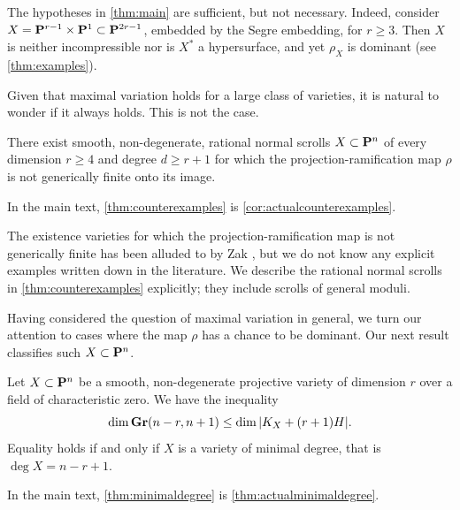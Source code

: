 \documentclass[11pt,reqno]{amsart}
\theoremstyle{plain}
\theoremstyle{definition}
\theoremstyle{remark}
\numberwithin{equation}{section}
\numberwithin{equation}{section}
\begin{document}
The hypotheses in \autoref{thm:main} are sufficient, but not necessary.
Indeed, consider $X = \P^{r-1} \times \P^1 \subset \P^{2r-1}$, embedded by the Segre embedding, for $r \geq 3$.
Then $X$ is neither incompressible nor is $X^*$ a hypersurface, and yet $\rho_X$ is dominant (see \autoref{thm:examples}).

Given that maximal variation holds for a large class of varieties, it is natural to wonder if it always holds.
This is not the case.
\begin{maintheorem}
  \label{thm:counterexamples}
  There exist smooth, non-degenerate, rational normal scrolls $X \subset \P^{n}$ of every dimension $r \geq 4$ and degree $d \geq r+1$ for which the projection-ramification map $\rho$ is not generically finite onto its image.
\end{maintheorem}
In the main text, \autoref{thm:counterexamples} is \autoref{cor:actualcounterexamples}.

The existence varieties for which the projection-ramification map is not generically finite has been alluded to by Zak \cite{zak:}, but we do not know any explicit examples written down in the literature.
We describe the rational normal scrolls in \autoref{thm:counterexamples} explicitly; they include scrolls of general moduli.

Having considered the question of maximal variation in general, we turn our attention to cases where the map $\rho$ has a chance to be dominant.
Our next result classifies such $X \subset \P^n$.
\begin{maintheorem}\label{thm:minimaldegree}
  Let $X \subset \P^{n}$ be a smooth, non-degenerate projective variety of dimension $r$ over a field of characteristic zero.
  We have the inequality
  \[ \dim \Gr(n-r, n+1) \leq \dim |K_X + (r+1)H|.\]
  Equality holds if and only if $X$ is a variety of minimal degree, that is $\deg X = n-r+1$.
\end{maintheorem}
In the main text, \autoref{thm:minimaldegree} is \autoref{thm:actualminimaldegree}.
\end{document}
